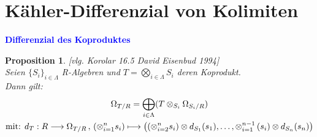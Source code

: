 \documentclass[10pt,a4paper]{report}
\newcommand{\ModulsOfDifferenzials}{David Eisenbud 1994}
\newcounter{Aussage}[chapter]
\newtheorem{prop}[Aussage]{Proposition}
\newcommand{\function}[5]{\nolinebreak{#1:#2 \longrightarrow #3 \, , \, #4 \longmapsto #5}}
\newcommand{\divR}[2]{\Omega_{#1/#2}}
\newcommand{\divf}[1]{d_{#1}}
\newcommand{\Tensor}[3]{#1 \otimes_{#2} #3}
\newcommand{\tensor}[3]{#1 \otimes #3}
\begin{document}
\section{Kähler-Differenzial von Kolimiten}
\textcolor{blue}{\textbf{Differenzial des Koproduktes}}
\begin{prop} \label{Differenzial des Koproduktes} \textit{[vlg. Korolar 16.5 \ModulsOfDifferenzials]}\\
Seien $\lbrace S_i \rbrace_{i \in \Lambda}$ R-Algebren und $T = \bigotimes_{i \in \Lambda} S_i$ deren Koprodukt.\\
Dann gilt:
\begin{gather*}
\divR{T}{R} = \bigoplus_{i\in \Lambda} ( \Tensor{T}{S_i}{\divR{S_i}{R}} )\\
\text{mit: }\function{\divf{T}}{R}{\divR{T}{R}}{\left(\otimes_{i = 1}^n s_i\right)}{\left(\tensor{\left(\otimes_{i = 2}^n s_i\right)}{S_1}{\divf{S_1}(s_1)},\dots,\tensor{\otimes_{i = 1}^{n - 1}\left( s_i \right)}{S_n}{\divf{S_n}}(s_n)\right)}
\end{gather*}
\end{prop}
\end{document}
